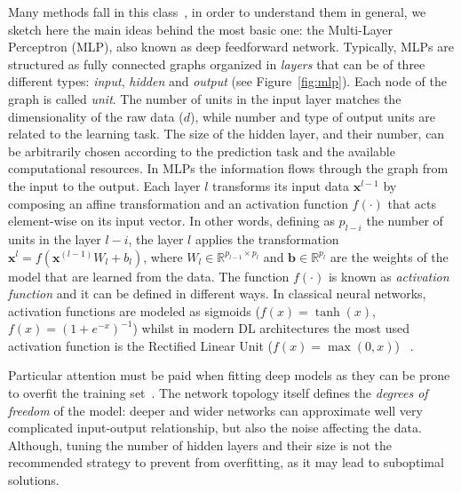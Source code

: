 	    Many methods fall in this class~\cite{lecun2015deep}, in order to understand them in general, we sketch here the main ideas behind the most basic one: the Multi-Layer Perceptron (MLP), also known as deep feedforward network.
	    Typically, MLPs are structured as fully connected graphs organized in \textit{layers} that can be of three different types: \textit{input},  \textit{hidden} and \textit{output} (see Figure~\ref{fig:mlp}). Each node of the graph is called \textit{unit}. The number of units in the input layer matches the dimensionality of the raw data ($d$), while number and type of output units are related to the learning task. The size of the hidden layer, and their number, can be arbitrarily chosen according to the prediction task and the available computational resources.
	    In MLPs the information flows through the graph from the input to the output. Each layer $l$ transforms its input data $\bm{x}^{l-1}$ by composing an affine transformation and an activation function $f(\cdot)$ that acts element-wise on its input vector. In other words, defining as $p_{l-i}$ the number of units in the layer $l-i$, the layer $l$ applies the transformation $\bm{x}^{l} = f(\bm{x}^{(l-1)}W_l+b_l)$, where $W_l \in \mathbb{R}^{p_{l-1} \times p_l}$ and $\bm{b} \in \mathbb{R}^{p_l}$ are the weights of the model that are learned from the data. The function $f(\cdot)$ is known as \textit{activation function} and it can be defined in different ways. In classical neural networks, activation functions are modeled as sigmoids (\eg $f(x)=\tanh(x)$, $f(x)=(1+e^{-x})^{-1}$) whilst in modern DL architectures the most used activation function is the Rectified Linear Unit (\ie $f(x)=\max(0,x)$)~\cite{lecun2015deep} .

	    

	    Particular attention must be paid when fitting deep models as they can be prone to overfit the training set~\cite{angermueller2016deep}.
	    The network topology itself defines the \textit{degrees of freedom} of the model: deeper and wider networks can approximate well very complicated input-output relationship, but also the noise affecting the data.
	    Although, tuning the number of hidden layers and their size is not the recommended strategy to prevent from overfitting, as it may lead to suboptimal solutions.

